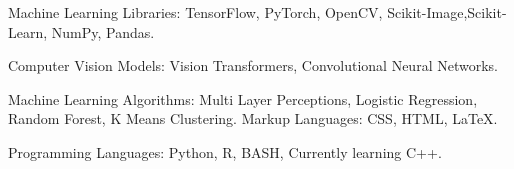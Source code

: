 

\begin{cvskills}

  \cvskill
    {\color{dm-logo}Machine Learning Libraries:} %
    {TensorFlow, PyTorch, OpenCV, Scikit-Image,\newline Scikit-Learn, NumPy, Pandas.} %

  \cvskill
    {\color{dm-logo}Computer Vision Models:} %
    {Vision Transformers, \newline Convolutional Neural  Networks.} %

   \cvskill
   {\color{dm-logo} Machine Learning Algorithms:}
   {Multi Layer Perceptions, Logistic Regression, \newline Random Forest, K Means Clustering.}
  \cvskill
    {\color{dm-logo}Markup Languages:} %
    {CSS, HTML, LaTeX.} %

  \cvskill
    {\color{dm-logo}Programming Languages:} %
    {Python, R, BASH, Currently learning C++.} %

\end{cvskills}
\newpage
